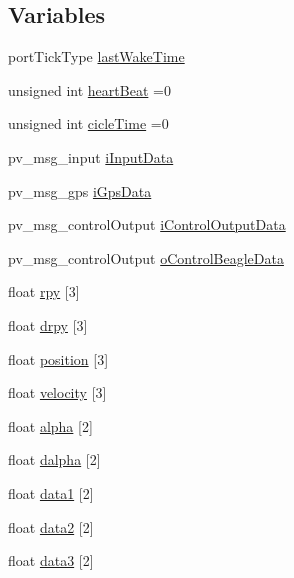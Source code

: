 \subsection*{Variables}
\begin{DoxyCompactItemize}
\item 
port\+Tick\+Type \hyperlink{group__app__do_gaa8db3871cb5f64abbd94ddd5a1db73a6}{last\+Wake\+Time}
\item 
unsigned int \hyperlink{group__app__do_ga24475be702ffcc5a6f0a5557040368ef}{heart\+Beat} =0
\item 
unsigned int \hyperlink{group__app__do_ga5bdb7b29978109a480db66886e58f475}{cicle\+Time} =0
\item 
pv\+\_\+msg\+\_\+input \hyperlink{group__app__do_gac40b8cfe5fd2000670ad57fe3e75ec89}{i\+Input\+Data}
\item 
pv\+\_\+msg\+\_\+gps \hyperlink{group__app__do_gac433f205128f94bd944f8ddcbff92744}{i\+Gps\+Data}
\item 
pv\+\_\+msg\+\_\+control\+Output \hyperlink{group__app__do_gacabca53fbaffdbf13b8e5a1c29b73bc4}{i\+Control\+Output\+Data}
\item 
pv\+\_\+msg\+\_\+control\+Output \hyperlink{group__app__do_ga83a7ee8a519c421eec8b1c7efc9e0501}{o\+Control\+Beagle\+Data}
\item 
float \hyperlink{group__app__do_ga1ba0a7c98794a4cda502c52d222ab614}{rpy} \mbox{[}3\mbox{]}
\item 
float \hyperlink{group__app__do_ga09c67ab670708cf621c9853aeb34fc2c}{drpy} \mbox{[}3\mbox{]}
\item 
float \hyperlink{group__app__do_ga1a3ca0a0bf0cdb13a8689c0558ead4df}{position} \mbox{[}3\mbox{]}
\item 
float \hyperlink{group__app__do_ga63a3bb0717d926f2f94b982b96e92237}{velocity} \mbox{[}3\mbox{]}
\item 
float \hyperlink{group__app__do_gaf2c21f3aed6186d912908dcd33a057d6}{alpha} \mbox{[}2\mbox{]}
\item 
float \hyperlink{group__app__do_gac55455b51b6abc065db2bfa3a99c0783}{dalpha} \mbox{[}2\mbox{]}
\item 
float \hyperlink{group__app__do_ga44b306459efc6e5e3543390e98fa8df7}{data1} \mbox{[}2\mbox{]}
\item 
float \hyperlink{group__app__do_ga2241fa8ef7e6a940cd8ce8dc13d8b4e8}{data2} \mbox{[}2\mbox{]}
\item 
float \hyperlink{group__app__do_gafb91c0f3a7dabe2beb8c046ff3cd4613}{data3} \mbox{[}2\mbox{]}
\item 

\end{DoxyCompactItemize}
